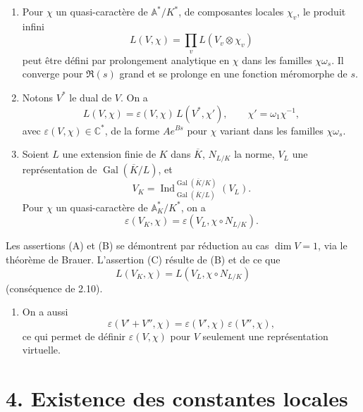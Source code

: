\documentclass[10pt,letterpaper]{article}
\newcommand{\C}{\mathbb C}
\newcommand{\Gal}{\operatorname{Gal}}
\newcommand{\Ind}{\operatorname{Ind}}
\providecommand{\Gal}{\operatorname{Gal}}
\providecommand{\Gal}{\operatorname{Gal}}
\providecommand{\Gal}{\operatorname{Gal}}
\providecommand{\Gal}{\operatorname{Gal}}
\providecommand{\Ind}{\operatorname{Ind}}
\begin{document}
\begin{enumerate}[label=(\Alph*)]
\item Pour \(\chi\) un quasi-caractère de \(\mathbb A^*/K^*\), de composantes locales \(\chi_v\), le produit infini
\[
L(V,\chi)=\prod_v L(V_v\otimes\chi_v)
\]
peut être défini par prolongement analytique en \(\chi\) dans les familles \(\chi\omega_s\). Il converge pour \(\Re(s)\) grand et se prolonge en une fonction méromorphe de \(s\).

\item Notons \(V^*\) le dual de \(V\). On a
\[
L(V,\chi)=\varepsilon(V,\chi)\,L(V^*,\chi'),
\qquad \chi'=\omega_1\chi^{-1},
\]
avec \(\varepsilon(V,\chi)\in\C^*\), de la forme \(Ae^{Bs}\) pour \(\chi\) variant dans les familles \(\chi\omega_s\).

\item Soient \(L\) une extension finie de \(K\) dans \(\overline K\), \(N_{L/K}\) la norme, \(V_L\) une représentation de \(\Gal(\overline K/L)\), et
\[
V_K=\Ind_{\Gal(\overline K/L)}^{\Gal(\overline K/K)}(V_L).
\]
Pour \(\chi\) un quasi-caractère de \(\mathbb A_K^*/K^*\), on a
\[
\varepsilon(V_K,\chi)=\varepsilon(V_L,\chi\circ N_{L/K}).
\]
\end{enumerate}
Les assertions (A) et (B) se démontrent par réduction au cas \(\dim V=1\), via le théorème de Brauer. L'assertion (C) résulte de (B) et de ce que
\[
L(V_K,\chi)=L(V_L,\chi\circ N_{L/K})
\]
(conséquence de 2.10).

\begin{enumerate}[label=(\Alph*),start=4]
\item On a aussi
\[
\varepsilon(V'+V'',\chi)=\varepsilon(V',\chi)\,\varepsilon(V'',\chi),
\]
ce qui permet de définir \(\varepsilon(V,\chi)\) pour \(V\) seulement une représentation virtuelle.
\end{enumerate}



\section*{4. Existence des constantes locales}
\end{document}
